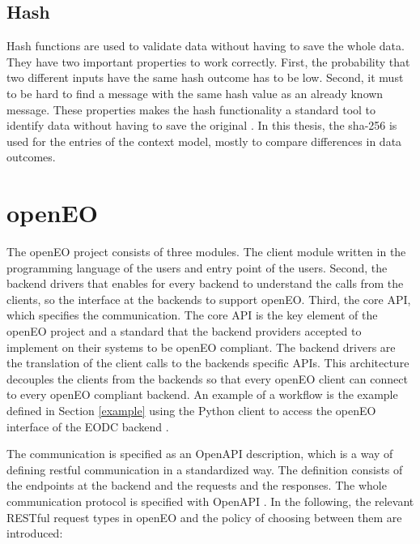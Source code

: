 \documentclass[draft,final]{vutinfth} %
\begin{document}
\subsection{Hash}\label{Hash}
Hash functions are used to validate data without having to save the whole data. They have two
important properties to work correctly. First, the probability that two different inputs have the same hash outcome has to be low. Second, it must to be hard to find a message with the same hash value as an already known message. These properties makes the hash functionality a standard tool to identify data without having to save the original \cite{3b412889270f46f59740fbf1ca8cd7e0}.  
In this thesis, the \gls{sha}-256 is used for the entries of the context model, mostly to compare differences in data outcomes.


\section{openEO}\label{openEO}
The openEO project consists of three modules. The client module written in the programming language of the users and entry point of the users. Second, the backend drivers that enables for every backend to understand the calls from the clients, so the interface at the backends to support openEO. Third, the core API, which specifies the communication. The core API is the key element of the openEO project and a standard that the backend providers accepted to implement on their systems to be openEO compliant. The backend drivers are the translation of the client calls to the backends specific APIs. This architecture decouples the clients from the backends so that every openEO client can connect to every openEO compliant backend. An example of a workflow is the example defined in Section \ref{example} using the Python client to access the openEO interface of the EODC backend \cite{openeo}. 

The communication is specified as an OpenAPI description, which is a way of defining \gls{rest}ful communication in a standardized way. The definition consists of the endpoints at the backend and the requests and the responses. The whole communication protocol is specified with OpenAPI \cite{openapi}. 
In the following, the relevant RESTful request types in openEO and the policy of choosing between them are introduced:
\end{document}
